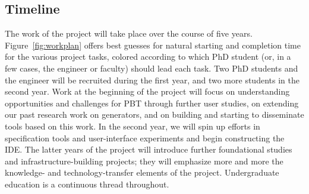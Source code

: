 \subsection*{Timeline}

The work of the project will take place over the course of five years.
Figure~\ref{fig:workplan} offers best guesses for natural starting and
completion time for the various project tasks, colored according to
which PhD student (or, in a few cases, the engineer or faculty) should
lead each task.
%
Two PhD students and the engineer will be recruited during the first
year, and two more students in the second year.  Work at the beginning
of the project will focus on understanding
opportunities and challenges for PBT through further user studies,
on extending
our past research work on generators, and on building and starting to
disseminate tools based on this work.  In the second year,
we will spin up efforts in specification tools and user-interface
experiments and begin constructing the \tyche{} IDE.  The latter years
of the project will introduce further foundational studies and
infrastructure-building projects; they will emphasize more and more the
knowledge- and technology-transfer elements of the project.
Undergraduate education is a continuous thread throughout.




